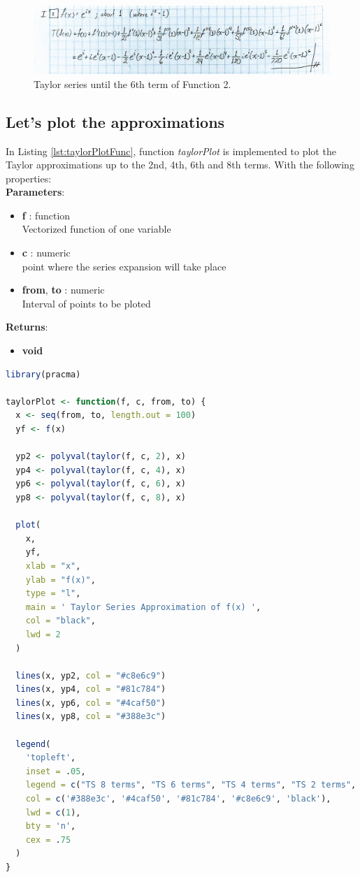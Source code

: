 \documentclass[11pt,a4paper]{article}
\begin{document}
\begin{figure}[!h]
\centering
\includegraphics[width=\textwidth]{./img/P1_part2.jpg}
\caption{Taylor series until the 6th term of Function 2.\label{fig:ansF2}}
\end{figure}

\subsection{Let's plot the approximations}\label{subsec:f2}

In Listing \ref{lst:taylorPlotFunc}, function \emph{taylorPlot} is implemented to plot the Taylor approximations up to the 2nd, 4th, 6th and 8th terms. With the following properties:\\

\textbf{Parameters}:
\begin{itemize}
  \item {\textbf{f} : function\\
Vectorized function of one variable}
  \item {\textbf{c} : numeric\\
point where the series expansion will take place}
  \item {\textbf{from}, \textbf{to} : numeric\\
Interval of points to be ploted}
\end{itemize}

\textbf{Returns}:
\begin{itemize}
  \item {\textbf{void}}
\end{itemize}

\begin{lstlisting}[frame=trBL, language=R, caption="The \emph{taylorPlot} function" \label{lst:taylorPlotFunc}]
library(pracma)

taylorPlot <- function(f, c, from, to) {
  x <- seq(from, to, length.out = 100)
  yf <- f(x)
  
  yp2 <- polyval(taylor(f, c, 2), x)
  yp4 <- polyval(taylor(f, c, 4), x)
  yp6 <- polyval(taylor(f, c, 6), x)
  yp8 <- polyval(taylor(f, c, 8), x)
  
  plot(
    x,
    yf,
    xlab = "x",
    ylab = "f(x)",
    type = "l",
    main = ' Taylor Series Approximation of f(x) ',
    col = "black",
    lwd = 2
  )
  
  lines(x, yp2, col = "#c8e6c9")
  lines(x, yp4, col = "#81c784")
  lines(x, yp6, col = "#4caf50")
  lines(x, yp8, col = "#388e3c")
  
  legend(
    'topleft',
    inset = .05,
    legend = c("TS 8 terms", "TS 6 terms", "TS 4 terms", "TS 2 terms", "f(x)"),
    col = c('#388e3c', '#4caf50', '#81c784', '#c8e6c9', 'black'),
    lwd = c(1),
    bty = 'n',
    cex = .75
  )
}
\end{lstlisting}
\end{document}
